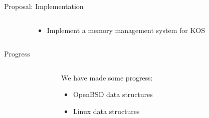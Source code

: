 \documentclass[aspectratio=169]{beamer}
\newcommand{\bi}{\begin{itemize}}
\newcommand{\ei}{\end{itemize}}
\begin{document}
\begin{frame}{Proposal: Implementation}
  \begin{columns}[T]
    \begin{column}{0.2\textwidth}
    \end{column}
    \begin{column}{0.6\textwidth}
      \bi
      \pause
    \item Implement a memory management system for KOS
      \ei
    \end{column}
    \begin{column}{0.2\textwidth}
    \end{column}
  \end{columns}
\end{frame}

\begin{frame}{Progress}
  \begin{columns}[T]
    \begin{column}{0.2\textwidth}
    \end{column}
    \begin{column}{0.6\textwidth}
      We have made some progress:
      \bi
    \item OpenBSD data structures
    \item Linux data structures
      \ei
    \end{column}
    \begin{column}{0.2\textwidth}
    \end{column}
  \end{columns}
\end{frame}
\end{document}
